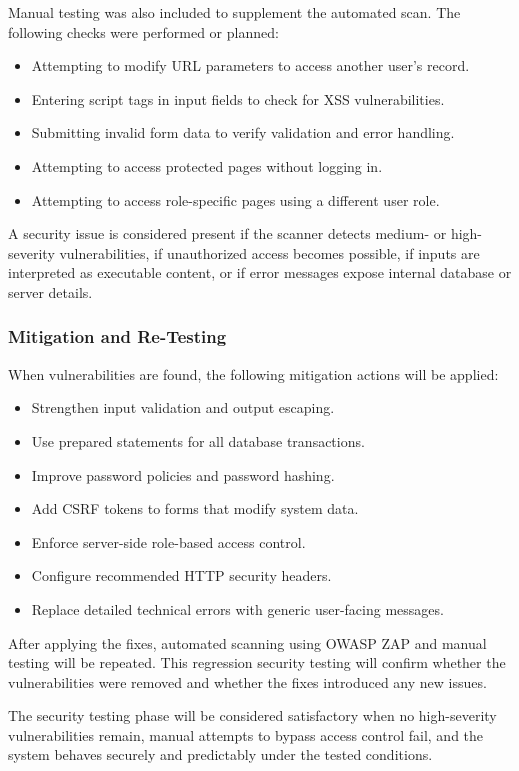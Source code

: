 Manual testing was also included to supplement the automated scan. The following checks were performed or planned:

\begin{itemize}
    \item Attempting to modify URL parameters to access another user's record.
    \item Entering script tags in input fields to check for XSS vulnerabilities.
    \item Submitting invalid form data to verify validation and error handling.
    \item Attempting to access protected pages without logging in.
    \item Attempting to access role-specific pages using a different user role.
\end{itemize}

A security issue is considered present if the scanner detects medium- or high-severity vulnerabilities, if unauthorized access becomes possible, if inputs are interpreted as executable content, or if error messages expose internal database or server details.

\subsubsection{Mitigation and Re-Testing}

When vulnerabilities are found, the following mitigation actions will be applied:

\begin{itemize}
    \item Strengthen input validation and output escaping.
    \item Use prepared statements for all database transactions.
    \item Improve password policies and password hashing.
    \item Add CSRF tokens to forms that modify system data.
    \item Enforce server-side role-based access control.
    \item Configure recommended HTTP security headers.
    \item Replace detailed technical errors with generic user-facing messages.
\end{itemize}

After applying the fixes, automated scanning using OWASP ZAP and manual testing will be repeated. This regression security testing will confirm whether the vulnerabilities were removed and whether the fixes introduced any new issues.

The security testing phase will be considered satisfactory when no high-severity vulnerabilities remain, manual attempts to bypass access control fail, and the system behaves securely and predictably under the tested conditions.